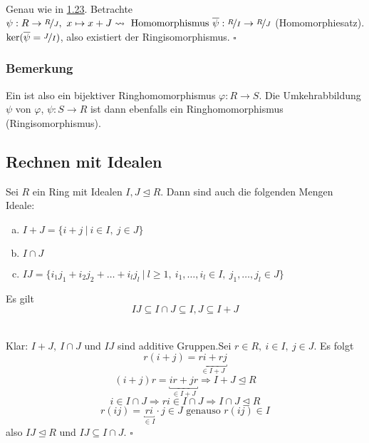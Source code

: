 \\
Genau wie in \hyperref[sub:isomorphiesaetze]{1.23}. Betrachte $\psi:R\to\nicefrac{R}{J},~x\mapsto x+J \rightsquigarrow \text{ Homomorphismus }\overline{\psi}:\nicefrac{R}{I}\to\nicefrac{R}{J}$ (Homomorphiesatz). $\ker(\overline{\psi}=\nicefrac{J}{I})$, also existiert der Ringisomorphismus.
\hfill $\square$

\subsubsection*{Bemerkung}
Ein  ist also ein bijektiver Ringhomomorphismus $\varphi:R\to S$. 
Die Umkehrabbildung $\psi$ von $\varphi$, $\psi:S\to R$ ist dann ebenfalls ein Ringhomomorphismus (Ringisomorphismus).


\subsection{Rechnen mit Idealen}
\label{sub:rechnen_ideale}
Sei $R$ ein Ring mit Idealen $I,J\trianglelefteq R$. Dann sind auch die folgenden Mengen Ideale:
\begin{enumerate}[(a)]
	\item $I+J=\{i+j~|~i\in I,~j\in J\}$
	\item $I\cap J$
	\item $IJ=\{i_1j_1+i_2j_2+\dots+i_lj_l~|~l\ge 1,~i_1,\dots,i_l\in I,~j_1,\dots,j_l\in J \}$
\end{enumerate}
Es gilt
\[
IJ\subseteq I\cap J\subseteq I,J\subseteq I+J
\]

\\
Klar: $I+J,~I\cap J$ und $IJ$ sind additive Gruppen.Sei $r\in R,~i\in I,~j\in J$. 
Es folgt
\[
r(i+j)=\underbracket{ri+rj}_{\in I+J}
\]
\[
(i+j)r=\underbracket{ir+jr}_{\in I+J}\Rightarrow I+J\trianglelefteq R
\]
\[
i\in I\cap J \Rightarrow ri\in I\cap J\Rightarrow I\cap J\trianglelefteq R
\]
\[
r(ij)=\underbracket{ri}_{\in I}\cdot j\in J \text{ genauso } r(ij)\in I
\]
also $IJ\trianglelefteq R$ und $IJ\subseteq I\cap J$.
\hfill $\square$

